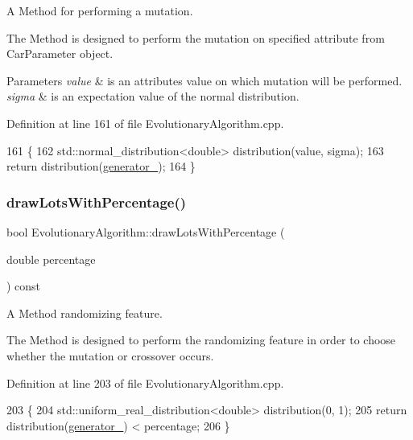 A Method for performing a mutation. 

The Method is designed to perform the mutation on specified attribute from Car\+Parameter object. 
\begin{DoxyParams}{Parameters}
{\em value} & is an attribute\textquotesingle{}s value on which mutation will be performed. \\
\hline
{\em sigma} & is an expectation value of the normal distribution. \\
\hline
\end{DoxyParams}


Definition at line 161 of file Evolutionary\+Algorithm.\+cpp.


\begin{DoxyCode}
161                                                                        \{
162     std::normal\_distribution<double> distribution(value, sigma);
163     \textcolor{keywordflow}{return} distribution(\hyperlink{classEvolutionaryAlgorithm_adbd823d385ad95bf20496fd2fc25ccde}{generator\_});
164 \}
\end{DoxyCode}
\mbox{\label{classEvolutionaryAlgorithm_a20aec1049a8837cddef2305259450fe3}} 
\subsubsection{\texorpdfstring{draw\+Lots\+With\+Percentage()}{drawLotsWithPercentage()}}
{\footnotesize\ttfamily bool Evolutionary\+Algorithm\+::draw\+Lots\+With\+Percentage (\begin{DoxyParamCaption}\item[{double}]{percentage }\end{DoxyParamCaption}) const\hspace{0.3cm}{\ttfamily [private]}}



A Method randomizing feature. 

The Method is designed to perform the randomizing feature in order to choose whether the mutation or crossover occurs. 

Definition at line 203 of file Evolutionary\+Algorithm.\+cpp.


\begin{DoxyCode}
203                                                                           \{
204     std::uniform\_real\_distribution<double> distribution(0, 1);
205     \textcolor{keywordflow}{return} distribution(\hyperlink{classEvolutionaryAlgorithm_adbd823d385ad95bf20496fd2fc25ccde}{generator\_}) < percentage;
206 \}
\end{DoxyCode}
\mbox{\label{classEvolutionaryAlgorithm_aad3e66c5d020fdcf1cb1e5ade0f01385}} 
